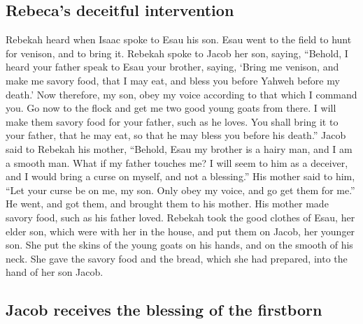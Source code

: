 \hypertarget{rebecas-deceitful-intervention}{%
\subsection{Rebeca's deceitful
intervention}\label{rebecas-deceitful-intervention}}

 Rebekah heard when Isaac spoke to Esau his son. Esau went
to the field to hunt for venison, and to bring it. 
Rebekah spoke to Jacob her son, saying, ``Behold, I heard your father
speak to Esau your brother, saying,  `Bring me venison,
and make me savory food, that I may eat, and bless you before Yahweh
before my death.'  Now therefore, my son, obey my voice
according to that which I command you.  Go now to the
flock and get me two good young goats from there. I will make them
savory food for your father, such as he loves.  You shall
bring it to your father, that he may eat, so that he may bless you
before his death.''  Jacob said to Rebekah his mother,
``Behold, Esau my brother is a hairy man, and I am a smooth man.
 What if my father touches me? I will seem to him as a
deceiver, and I would bring a curse on myself, and not a blessing.''
 His mother said to him, ``Let your curse be on me, my
son. Only obey my voice, and go get them for me.''  He
went, and got them, and brought them to his mother. His mother made
savory food, such as his father loved.  Rebekah took the
good clothes of Esau, her elder son, which were with her in the house,
and put them on Jacob, her younger son.  She put the
skins of the young goats on his hands, and on the smooth of his neck.
 She gave the savory food and the bread, which she had
prepared, into the hand of her son Jacob.

\hypertarget{jacob-receives-the-blessing-of-the-firstborn}{%
\subsection{Jacob receives the blessing of the
firstborn}\label{jacob-receives-the-blessing-of-the-firstborn}}

